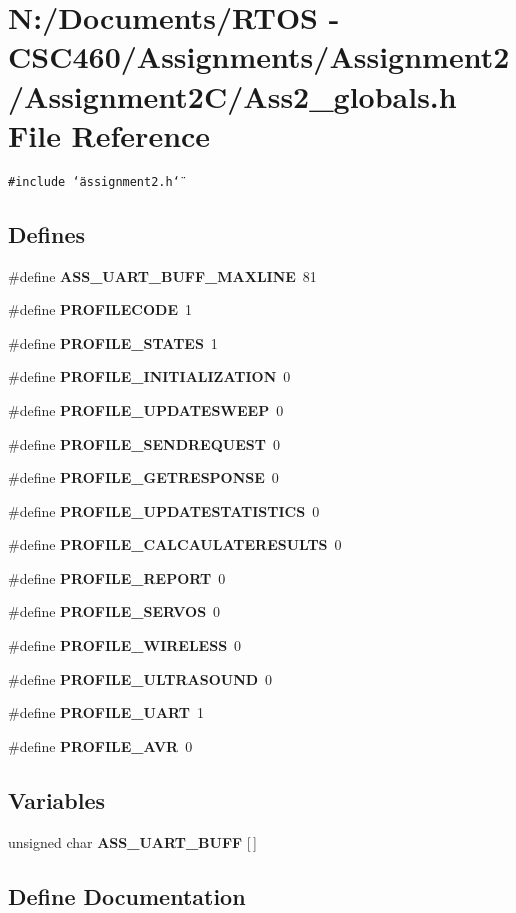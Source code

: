 \section{N:/Documents/RTOS - CSC460/Assignments/Assignment2/Assignment2C/Ass2\_\-globals.h File Reference}
\label{_ass2__globals_8h}
{\tt \#include \char`\"{}assignment2.h\char`\"{}}\par
\subsection*{Defines}
\begin{CompactItemize}
\item 
\#define {\bf ASS\_\-UART\_\-BUFF\_\-MAXLINE}~81
\item 
\#define {\bf PROFILECODE}~1
\item 
\#define {\bf PROFILE\_\-STATES}~1
\item 
\#define {\bf PROFILE\_\-INITIALIZATION}~0
\item 
\#define {\bf PROFILE\_\-UPDATESWEEP}~0
\item 
\#define {\bf PROFILE\_\-SENDREQUEST}~0
\item 
\#define {\bf PROFILE\_\-GETRESPONSE}~0
\item 
\#define {\bf PROFILE\_\-UPDATESTATISTICS}~0
\item 
\#define {\bf PROFILE\_\-CALCAULATERESULTS}~0
\item 
\#define {\bf PROFILE\_\-REPORT}~0
\item 
\#define {\bf PROFILE\_\-SERVOS}~0
\item 
\#define {\bf PROFILE\_\-WIRELESS}~0
\item 
\#define {\bf PROFILE\_\-ULTRASOUND}~0
\item 
\#define {\bf PROFILE\_\-UART}~1
\item 
\#define {\bf PROFILE\_\-AVR}~0
\end{CompactItemize}
\subsection*{Variables}
\begin{CompactItemize}
\item 
unsigned char {\bf ASS\_\-UART\_\-BUFF} [$\,$]
\end{CompactItemize}


\subsection{Define Documentation}
